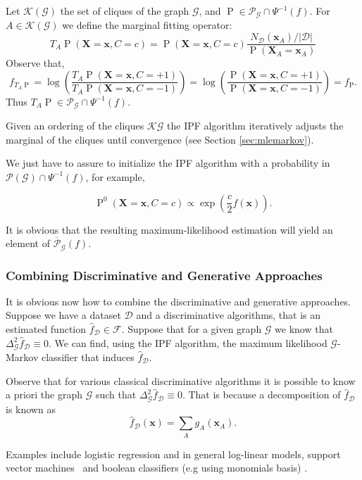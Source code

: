 \documentclass[11pt,a4paper, twoside]{book}
\newcommand{\Pp}{\operatorname{P}}
\newcommand{\bx}{\mathbf{x}}
\newcommand{\bX}{\mathbf{X}}
\begin{document}
Let $\mathcal{K}({\mathcal{G}})$ the set of cliques of the graph $\mathcal{G}$, and $\Pp \in \mathcal{P}_{\mathcal{G}}\cap \Psi^{-1}(f)$. For $A \in \mathcal{K}({\mathcal{G}})$ we define the marginal fitting operator:
$$ T_{A}\Pp(\bX=\bx, C=c) = \Pp(\bX=\bx, C=c) \frac{N_{\mathcal{D}}(\bx_A)/|\mathcal{D}|}{\Pp(\bX_A=\bx_A)}$$
Observe that,
$$ f_{T_A \Pp}= \log\left(\frac{T_A\Pp(\bX=\bx,C=+1)}{T_A\Pp(\bX=\bx,C=-1)}\right)=
\log\left(\frac{\Pp(\bX=\bx,C=+1)}{\Pp(\bX=\bx,C=-1)}\right)=f_{\Pp}.$$
Thus $T_A\Pp \in \mathcal{P}_{\mathcal{G}}\cap \Psi^{-1}(f)$.

Given an ordering of the cliques $\mathcal{K}{\mathcal{G}}$ the IPF algorithm iteratively adjusts the marginal of the cliques until convergence (see Section \ref{sec:mlemarkov}). 
 
We just have to assure to initialize the IPF algorithm with a probability in $\mathcal{P}({\mathcal{G}}) \cap \Psi^{-1}(f)$, for example,

$$ \Pp^{0}(\bX=\bx,C=c) \varpropto \exp{\left(\frac{c}{2}f(\bx)\right)}. $$ 

It is obvious that the resulting maximum-likelihood estimation will yield an element of $\overline{\mathcal{P}}_{\mathcal{G}}(f)$.

\subsubsection{Combining Discriminative and Generative Approaches}


It is obvious now how to combine the discriminative and generative approaches. Suppose we have a dataset $\mathcal{D}$ and a discriminative algorithms, that is an estimated function $\hat{f}_{\mathcal{D}} \in \mathcal{F}$. Suppose that for a given graph $\mathcal{G}$ we know that $\Delta^{2}_{\mathcal{G}} \hat{f}_{\mathcal{D}} \equiv 0$. We can find, using the IPF algorithm, the maximum likelihood $\mathcal{G}$-Markov classifier that induces $\hat{f}_{\mathcal{D}}$.

Observe that for various classical discriminative algorithms it is possible to know a priori the graph $\mathcal{G}$ such that $\Delta^{2}_{\mathcal{G}} \hat{f}_{\mathcal{D}} \equiv 0$. That is because a decomposition of $\hat{f}_{\mathcal{D}}$ is known as
$$ \hat{f}_{\mathcal{D}}(\bx) = \sum_{A} g_{A}(\bx_A) .$$

Examples include logistic regression and in general log-linear models, support vector machines~\citep{Cortes1995} and boolean classifiers (e.g using monomials basis) \citep{odonnell2014}.
\end{document}
